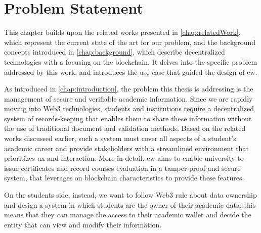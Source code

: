 \chapter{Problem Statement}
\label{chap:problemStatement}
This chapter builds upon the related works presented in \cref{chap:relatedWork}, which represent the current state of the art for our problem, and the background concepts introduced in \cref{chap:background}, which describe decentralized technologies with a focusing on the blockchain. It delves into the specific problem addressed by this work, and introduces the use case that guided the design of \gls{ew}.

As introduced in \cref{chap:introduction}, the problem this thesis is addressing is the management of secure and verifiable academic information. Since we are rapidly moving into Web3 technologies, students and institutions require a decentralized system of records-keeping that enables them to share these information without the use of traditional document and validation methods. Based on the related works discussed earlier, such a system must cover all aspects of a student's academic career and provide stakeholders with a streamlined environment that prioritizes \gls{ux} and interaction. More in detail, \gls{ew} aims to enable university to issue certificates and record courses evaluation in a tamper-proof and secure system, that leverages on blockchain characteristics to provide these features. 

On the students side, instead, we want to follow Web3 rule about data ownership and design a system in which students are the owner of their academic data; this means that they can manage the access to their academic wallet and decide the entity that can view and modify their information.

